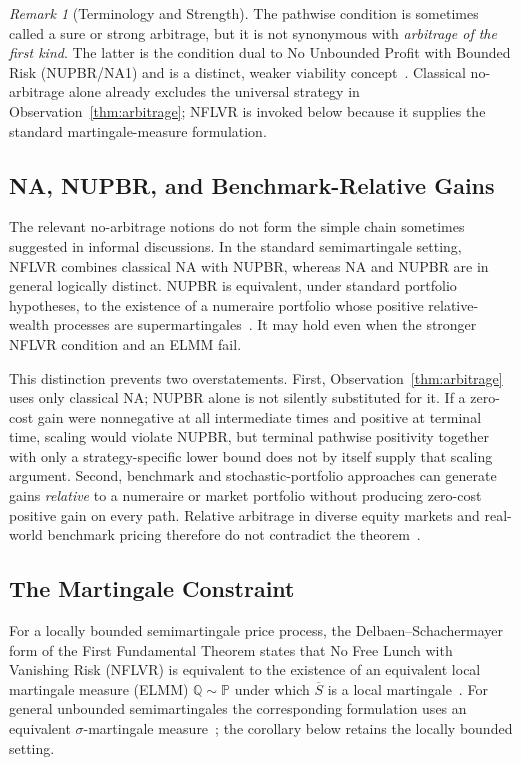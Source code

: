 \documentclass[aps,pra,reprint,superscriptaddress,amsmath,amssymb,floatfix]{revtex4-2}
\theoremstyle{plain}
\theoremstyle{definition}
\theoremstyle{remark}
\newtheorem{remark}{Remark}
\begin{document}
\begin{remark}[Terminology and Strength]
The pathwise condition is sometimes called a sure or strong arbitrage, but it
is not synonymous with \emph{arbitrage of the first kind}. The latter is the
condition dual to No Unbounded Profit with Bounded Risk (NUPBR/NA1) and is a
distinct, weaker viability concept~\cite{Kardaras2012}. Classical
no-arbitrage alone already excludes the universal strategy in
Observation~\ref{thm:arbitrage}; NFLVR is invoked below because it supplies the
standard martingale-measure formulation.
\end{remark}

\subsection{NA, NUPBR, and Benchmark-Relative Gains}

The relevant no-arbitrage notions do not form the simple chain sometimes
suggested in informal discussions. In the standard semimartingale setting,
NFLVR combines classical NA with NUPBR, whereas NA and NUPBR are in general
logically distinct. NUPBR is equivalent, under standard portfolio hypotheses,
to the existence of a numeraire portfolio whose positive relative-wealth
processes are supermartingales~\cite{KaratzasKardaras2007,Kardaras2012}.
It may hold even when the stronger NFLVR condition and an ELMM fail.

This distinction prevents two overstatements. First, Observation~\ref{thm:arbitrage}
uses only classical NA; NUPBR alone is not silently substituted for it. If a
zero-cost gain were nonnegative at all intermediate times and positive at
terminal time, scaling would violate NUPBR, but terminal pathwise positivity
together with only a strategy-specific lower bound does not by itself supply
that scaling argument. Second, benchmark and stochastic-portfolio approaches
can generate gains \emph{relative} to a numeraire or market portfolio without
producing zero-cost positive gain on every path. Relative arbitrage in diverse
equity markets and real-world benchmark pricing therefore do not contradict
the theorem~\cite{FernholzKaratzasKardaras2005,PlatenHeath2010}.

\subsection{The Martingale Constraint}

For a locally bounded semimartingale price process, the
Delbaen--Schachermayer form of the First Fundamental Theorem states that No
Free Lunch with Vanishing Risk (NFLVR) is equivalent to the existence of an
equivalent local martingale measure (ELMM)
\(\mathbb{Q}\sim\mathbb{P}\) under which \(\overline S\) is a local
martingale~\cite{Harrison1981,Delbaen1994}. For general unbounded
semimartingales the corresponding formulation uses an equivalent
\(\sigma\)-martingale measure~\cite{DelbaenSchachermayer1998}; the corollary below
retains the locally bounded setting.
\end{document}

